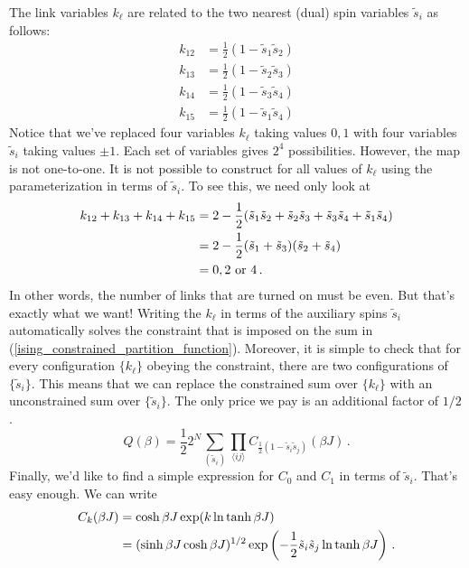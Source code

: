 \documentclass{article}
\theoremstyle{plain}\theoremheaderfont{\normalfont\bfseries}\theorembodyfont{\rmfamily}\theoremseparator{.}\newtheorem*{thm}{Theorem}\newtheorem*{law}{Law}\newtheorem*{pos}{Postulate}
\numberwithin{equation}{section}
\begin{document}
    The link variables \(k_\ell\) are related to the two nearest (dual) spin variables \(\tilde{s}_i\) as follows:
    \begin{align}
        k_{12}&=\frac{1}{2}(1-\tilde{s}_1\tilde{s}_2)\\
        k_{13}&=\frac{1}{2}(1-\tilde{s}_2\tilde{s}_3)\\
        k_{14}&=\frac{1}{2}(1-\tilde{s}_3\tilde{s}_4)\\
        k_{15}&=\frac{1}{2}(1-\tilde{s}_1\tilde{s}_4)
    \end{align}
    Notice that we've replaced four variables \(k_\ell\) taking values \(0,1\) with four variables \(\tilde{s}_i\) taking values \(\pm1\). Each set of variables gives \(2^4\) possibilities. However, the map is not one-to-one. It is not possible to construct for all values of \(k_\ell\) using the parameterization in terms of \(\tilde{s}_i\). To see this, we need only look at
    \begin{align}
        k_{12}+k_{13}+k_{14}+k_{15}&=2-\frac{1}{2}(\tilde{s}_1\tilde{s}_2+\tilde{s}_2\tilde{s}_3+\tilde{s}_3\tilde{s}_4+\tilde{s}_1\tilde{s}_4)\notag \\
        &=2-\frac{1}{2}(\tilde{s}_1+\tilde{s}_3)(\tilde{s}_2+\tilde{s}_4)\notag \\
        &=0,2\text{ or }4\,.
    \end{align}
    In other words, the number of links that are turned on must be even. But that's exactly what we want! Writing the \(k_\ell\) in terms of the auxiliary spins \(\tilde{s}_i\) automatically solves the constraint that is imposed on the sum in (\ref{ising_constrained_partition_function}). Moreover, it is simple to check that for every configuration \(\{k_\ell\}\) obeying the constraint, there are two configurations of \(\{\tilde{s}_i\}\). This means that we can replace the constrained sum over \(\{k_\ell\}\) with an unconstrained sum over \(\{\tilde{s}_i\}\). The only price we pay is an additional factor of \(1/2\).
    \begin{equation}
        Q(\beta)=\frac{1}{2}2^N\sum_{(\tilde{s}_i)}\prod_{\langle ij\rangle}C_{\frac{1}{2}(1-\tilde{s}_i\tilde{s}_j)}(\beta J)\,.
    \end{equation}
    Finally, we'd like to find a simple expression for \(C_0\) and \(C_1\) in terms of \(\tilde{s}_i\). That's easy enough. We can write
    \begin{align}
        C_k(\beta J)&=\cosh\beta J\exp(k\ln\tanh\beta J)\notag\\
        &=(\sinh\beta J\cosh\beta J)^{1/2}\exp\left(-\frac{1}{2}\tilde{s}_i\tilde{s}_j\ln\tanh\beta J\right)\,.
    \end{align}
\end{document}
